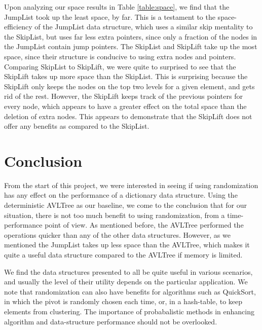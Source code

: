 \documentclass[oribibl]{llncs}
\begin{document}
Upon analyzing our space results in Table \ref{table:space}, we find that the JumpList took up the least space, by far. This is a testament to the space-efficiency of the JumpList data structure, which uses a similar skip mentality to the SkipList, but uses far less extra pointers, since only a fraction of the nodes in the JumpList contain jump pointers. The SkipList and SkipLift take up the most space, since their structure is conducive to using extra nodes and pointers. Comparing SkipList to SkipLift, we were quite to surprised to see that the SkipLift takes up more space than the SkipList. This is surprising because the SkipLift only keeps the nodes on the top two levels for a given element, and gets rid of the rest. However, the SkipLift keeps track of the previous pointers for every node, which appears to have a greater effect on the total space than the deletion of extra nodes. This appears to demonstrate that the SkipLift does not offer any benefits as compared to the SkipList.

\section{Conclusion}
\label{sctn:Conclusion}

From the start of this project, we were interested in seeing if using randomization has any effect on the performance of a dictionary data structure. Using the deterministic AVLTree as our baseline, we come to the conclusion that for our situation, there is not too much benefit to using randomization, from a time-performance point of view. As mentioned before, the AVLTree performed the operations quicker than any of the other data structures. However, as we mentioned the JumpList takes up less space than the AVLTree, which makes it quite a useful data structure compared to the AVLTree if memory is limited.

We find the data structures presented to all be quite useful in various scenarios, and usually the level of their utility depends on the particular application. We note that randomization can also have benefits for algorithms such as QuickSort, in which the pivot is randomly chosen each time, or, in a hash-table, to keep elements from clustering. The importance of probabalistic methods in enhancing algorithm and data-structure performance should not be overlooked.




\end{document}
